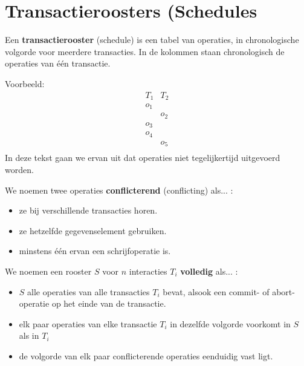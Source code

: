 \documentclass[transacties.tex]{subfiles}
\begin{document}
\section{Transactieroosters (Schedules}
\begin{de}
Een \textbf{transactierooster} (schedule) is een tabel van operaties, in chronologische volgorde voor meerdere transacties. In de kolommen staan chronologisch de operaties van \'e\'en transactie.
\end{de}
Voorbeeld:
\[
\begin{array}{c|c}
T_1 & T_2\\
\hline
o_1 & \\
& o_2\\
o_3&\\
o_4&\\
& o_5\\
\end{array}
\]
In deze tekst gaan we ervan uit dat operaties niet tegelijkertijd uitgevoerd worden.


\begin{de}
We noemen twee operaties \textbf{conflicterend} (conflicting) als... :
\begin{itemize}
\item ze bij verschillende transacties horen.
\item ze hetzelfde gegevenselement gebruiken.
\item minstens \'e\'en ervan een schrijfoperatie is.
\end{itemize}
\end{de}

\begin{de}
We noemen een rooster $S$ voor $n$ interacties $T_i$ \textbf{volledig} als... :
\begin{itemize}
\item $S$ alle operaties van alle transacties $T_i$ bevat, alsook een commit- of abort-operatie op het einde van de transactie.
\item elk paar operaties van elke transactie $T_i$ in dezelfde volgorde voorkomt in $S$ als in $T_i$
\item de volgorde van elk paar conflicterende operaties eenduidig vast ligt.
\end{itemize}
\end{de}
\end{document}
